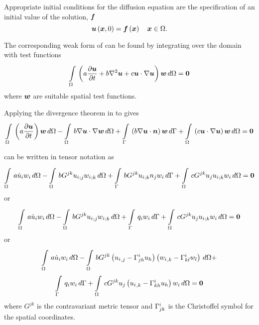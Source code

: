 Appropriate initial conditions for the diffusion equation are the
specification of an initial value of the solution, $\vect{f}$ \ie
\begin{equation}
  \fnof{\vect{u}}{\vect{x},0} = \fnof{\vect{f}}{\vect{x}} \quad \vect{x}\in\Omega.
  \label{eqn:BurgersInitialC} 
\end{equation}


The corresponding weak form of  can be
found by integrating over the domain with test functions \ie
\begin{equation}
  \gint{\Omega}{}{\pbrac{a\delby{\vect{u}}{t}+
      b\laplacian{\vect{u}}+
      c\dotprod{\vect{u}}{\gradient{\vect{u}}}}\vect{w}}{\Omega}=\vect{0}
  \label{eqn:Burgersweakform1}
\end{equation}
where $\vect{w}$ are suitable spatial test functions.

Applying the divergence theorem in  to  gives
\begin{equation}
  \gint{\Omega}{}{\pbrac{a\delby{\vect{u}}{t}}\vect{w}}{\Omega}-
      \gint{\Omega}{}{b\dotprod{\gradient{\vect{u}}}{\gradient{\vect{w}}}}{\Omega}
      +\gint{\Gamma}{}{\pbrac{b\dotprod{\gradient{\vect{u}}}{\normal}}\vect{w}}{\Gamma}+
      \gint{\Omega}{}{\pbrac{c\dotprod{\vect{u}}{\gradient{\vect{u}}}}\vect{w}}{\Omega}
      =\vect{0}
  \label{eqn:Burgersweakform2}
\end{equation}


 can be written in tensor notation as
\begin{equation}
  \gint{\Omega}{}{a\dot{u}_{i}w_{i}}{\Omega}-
  \gint{\Omega}{}{bG^{jk}\covarderiv{u_{i}}{j}\covarderiv{w_{i}}{k}}{\Omega}+
  \gint{\Gamma}{}{bG^{jk}\covarderiv{u_{i}}{k}n_{j}w_{i}}{\Gamma} +
  \gint{\Omega}{}{cG^{jk}u_{j}\covarderiv{u_{i}}{k}w_{i}}{\Omega}=\vect{0}
  \label{eqn:Burgerstensorform1}
\end{equation}
or
\begin{equation}
  \gint{\Omega}{}{a\dot{u}_{i}w_{i}}{\Omega}-
  \gint{\Omega}{}{bG^{jk}\covarderiv{u_{i}}{j}\covarderiv{w_{i}}{k}}{\Omega}+
  \gint{\Gamma}{}{q_{i}w_{i}}{\Gamma} +
  \gint{\Omega}{}{cG^{jk}u_{j}\covarderiv{u_{i}}{k}w_{i}}{\Omega}=\vect{0}
  \label{eqn:Burgerstensorform2}
\end{equation}
or
\begin{multline}
  \gint{\Omega}{}{a\dot{u}_{i}w_{i}}{\Omega}-
  \gint{\Omega}{}{bG^{jk}\pbrac{\partialderiv{u_{i}}{j}-\christoffel{i}{j}{h}u_{h}}
    \pbrac{\partialderiv{w_{i}}{k}-\christoffel{i}{k}{l}w_{l}}}{\Omega}+ \\
  \gint{\Gamma}{}{q_{i}w_{i}}{\Gamma} +
  \gint{\Omega}{}{cG^{jk}u_{j}\pbrac{\partialderiv{u_{i}}{k}-
      \christoffel{i}{k}{h}u_{h}}w_{i}}{\Omega}=\vect{0}
  \label{eqn:Burgerstensorform3}
\end{multline}
where $G^{jk}$ is the contravariant metric tensor and $ \Gamma^{i}_{jk} $
is the Christoffel symbol for the spatial coordinates.

